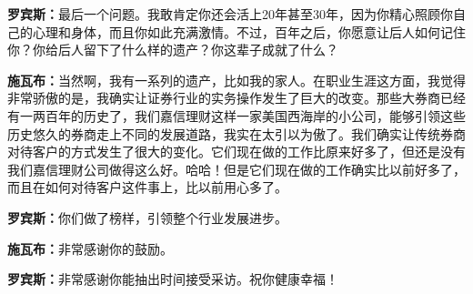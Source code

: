 \begin{BookQuote}
\textbf{罗宾斯：}最后一个问题。我敢肯定你还会活上20年甚至30年，因为你精心照顾你自己的心理和身体，而且你如此充满激情。不过，百年之后，你愿意让后人如何记住你？你给后人留下了什么样的遗产？你这辈子成就了什么？
\end{BookQuote}

\begin{BookQuote}
\textbf{施瓦布：}当然啊，我有一系列的遗产，比如我的家人。在职业生涯这方面，我觉得非常骄傲的是，我确实让证券行业的实务操作发生了巨大的改变。那些大券商已经有一两百年的历史了，我们嘉信理财这样一家美国西海岸的小公司，能够引领这些历史悠久的券商走上不同的发展道路，我实在太引以为傲了。我们确实让传统券商对待客户的方式发生了很大的变化。它们现在做的工作比原来好多了，但还是没有我们嘉信理财公司做得这么好。哈哈！但是它们现在做的工作确实比以前好多了，而且在如何对待客户这件事上，比以前用心多了。
\end{BookQuote}

\begin{BookQuote}
\textbf{罗宾斯：}你们做了榜样，引领整个行业发展进步。
\end{BookQuote}

\begin{BookQuote}
\textbf{施瓦布：}非常感谢你的鼓励。
\end{BookQuote}

\begin{BookQuote}
\textbf{罗宾斯：}非常感谢你能抽出时间接受采访。祝你健康幸福！
\end{BookQuote}
